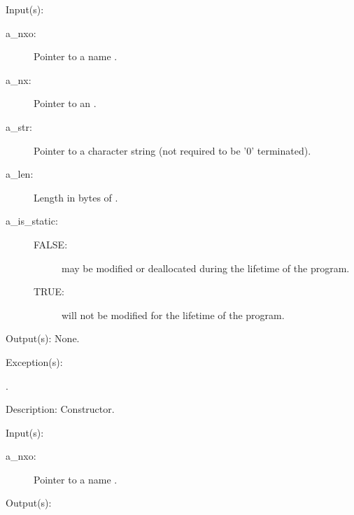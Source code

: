 \begin{capi}
\label{nxo_name_new}
	\begin{capilist}
	\item[Input(s): ]
		\begin{description}\item[]
		\item[a\_nxo: ]
			Pointer to a name .
		\item[a\_nx: ]
			Pointer to an .
		\item[a\_str: ]
			Pointer to a character string (not required to be
			'{\bs}0' terminated).
		\item[a\_len: ]
			Length in bytes of .
		\item[a\_is\_static: ]
			\begin{description}\item[]
			\item[FALSE: ]
				 may be modified or deallocated
				during the lifetime of the program.
			\item[TRUE: ]
				 will not be modified for the
				lifetime of the program.
			\end{description}
		\end{description}
	\item[Output(s): ] None.
	\item[Exception(s): ]
		\begin{description}\item[]
		\item[.]
		\end{description}
	\item[Description: ]
		Constructor.
	\end{capilist}
\label{nxo_name_str_get}
	\begin{capilist}
	\item[Input(s): ]
		\begin{description}\item[]
		\item[a\_nxo: ]
			Pointer to a name \classname{nxo}.
		\end{description}
	\item[Output(s): ]

\end{capilist}
\end{capi}
